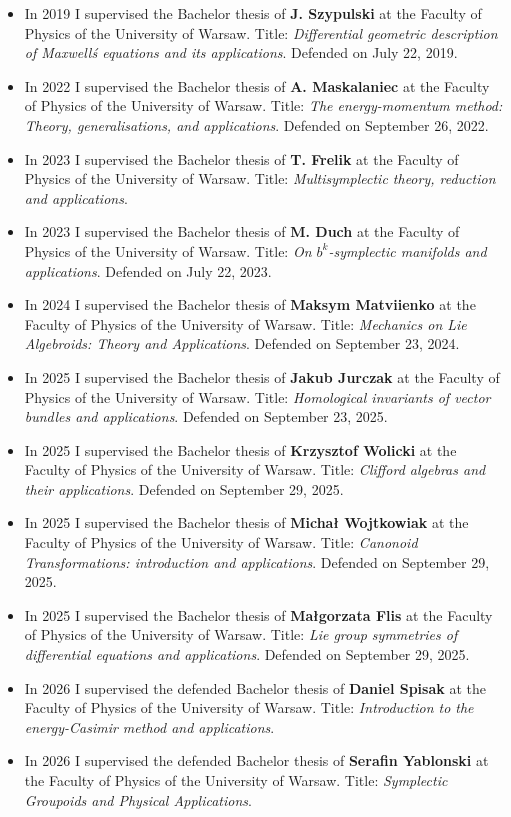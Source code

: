 \documentclass[12pt,reqno]{amsbook}
\begin{document}
\begin{itemize}
\item In 2019 I supervised the Bachelor thesis of {\bf J. Szypulski} at the Faculty of Physics of the University of Warsaw. Title: {\it Differential geometric description of Maxwell\'s equations and its applications}. Defended on July 22, 2019.
\item In 2022 I supervised  the Bachelor thesis of {\bf A. Maskalaniec} at the Faculty of Physics of the University of Warsaw. Title: {\it The energy-momentum method: Theory, generalisations, and applications}. Defended on September 26, 2022.
\item In 2023 I supervised  the Bachelor thesis of {\bf T. Frelik} at the Faculty of Physics of the University of Warsaw. Title: {\it Multisymplectic theory, reduction and applications}.
\item In 2023 I supervised  the Bachelor thesis of {\bf M. Duch} at the Faculty of Physics of the University of Warsaw. Title: {\it On $b^k$-symplectic manifolds and applications}. Defended on July 22, 2023.
\item In 2024 I supervised  the Bachelor thesis of {\bf  Maksym Matviienko} at the Faculty of Physics of the University of Warsaw. Title: {\it Mechanics on Lie Algebroids: Theory and Applications}. Defended on September 23, 2024.
\item In 2025 I supervised the Bachelor thesis of {\bf Jakub Jurczak} at the Faculty of Physics of the University of Warsaw. Title: {\it Homological invariants of vector bundles and applications}. Defended on September 23, 2025.
\item In 2025 I supervised the Bachelor thesis of {\bf Krzysztof Wolicki} at the Faculty of Physics of the University of Warsaw. Title: {\it Clifford algebras and their applications}. Defended on September 29, 2025.
\item In 2025 I supervised the Bachelor thesis of {\bf Michał Wojtkowiak} at the Faculty of Physics of the University of Warsaw. Title: {\it Canonoid Transformations: introduction and applications}. Defended on September 29, 2025.
\item In 2025 I supervised the Bachelor thesis of {\bf Małgorzata Flis} at the Faculty of Physics of the University of Warsaw. Title: {\it Lie group symmetries of differential equations and applications}. Defended on September 29, 2025.
\item In 2026 I supervised the defended Bachelor thesis of {\bf Daniel Spisak} at the Faculty of Physics of the University of Warsaw. Title: {\it Introduction to the energy-Casimir method and applications}.

\item In 2026 I supervised the defended Bachelor thesis of {\bf Serafin Yablonski} at the Faculty of Physics of the University of Warsaw. Title: {\it Symplectic Groupoids and Physical Applications}.

\end{itemize}
\end{document}
